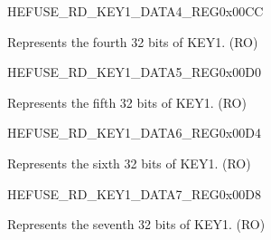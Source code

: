 \begin{register}{H}{EFUSE\_RD\_KEY1\_DATA4\_REG}{0x00CC}\label{regdesc:EFUSERDKEY1DATA4REG}
%
\regnewline%
\begin{regdesc}\begin{reglist}
\label{fielddesc:EFUSEKEY1DATA4}\item [EFUSE\_KEY1\_DATA4] Represents the fourth 32 bits of KEY1. (RO)
\end{reglist}\end{regdesc}
\end{register}


\begin{register}{H}{EFUSE\_RD\_KEY1\_DATA5\_REG}{0x00D0}\label{regdesc:EFUSERDKEY1DATA5REG}
%
\regnewline%
\begin{regdesc}\begin{reglist}
\label{fielddesc:EFUSEKEY1DATA5}\item [EFUSE\_KEY1\_DATA5] Represents the fifth 32 bits of KEY1. (RO)
\end{reglist}\end{regdesc}
\end{register}


\begin{register}{H}{EFUSE\_RD\_KEY1\_DATA6\_REG}{0x00D4}\label{regdesc:EFUSERDKEY1DATA6REG}
%
\regnewline%
\begin{regdesc}\begin{reglist}
\label{fielddesc:EFUSEKEY1DATA6}\item [EFUSE\_KEY1\_DATA6] Represents the sixth 32 bits of KEY1. (RO)
\end{reglist}\end{regdesc}
\end{register}


\begin{register}{H}{EFUSE\_RD\_KEY1\_DATA7\_REG}{0x00D8}\label{regdesc:EFUSERDKEY1DATA7REG}
%
\regnewline%
\begin{regdesc}\begin{reglist}
\label{fielddesc:EFUSEKEY1DATA7}\item [EFUSE\_KEY1\_DATA7] Represents the seventh 32 bits of KEY1. (RO)
\end{reglist}\end{regdesc}
\end{register}


